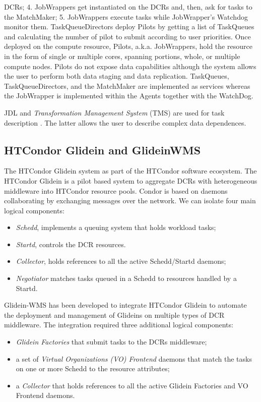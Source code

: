 DCRs; 4. JobWrappers get instantiated on the DCRs and, then,  ask for tasks to the MatchMaker; 5. JobWrappers execute tasks while JobWrapper’s Watchdog monitor them.
TaskQueueDirectors deploy Pilots by getting a list of TaskQueues and calculating the number of pilot to submit  according to user priorities.
Once deployed on the compute resource, Pilots, a.k.a. JobWrappers, hold the resource in the form of single or multiple cores, spanning portions, whole, or multiple compute nodes. Pilots do not expose data capabilities although the system allows the user to perform both data staging and data replication. 
TaskQueues, TaskQueueDirectors, and the MatchMaker are implemented as services whereas the JobWrapper is implemented within the Agents together with the WatchDog. 

JDL and \emph{Transformation Management System} (TMS) are used for task description \cite{Tsaregorodtsev2006,Pacini2006}. The latter allows the user to describe complex data dependences. 
\subsection{HTCondor Glidein and GlideinWMS}
The HTCondor Glidein system  as part of the HTCondor software ecosystem. The HTCondor Glidein is a pilot based system to aggregate DCRs with heterogeneous middleware into HTCondor resource pools.
Condor is based on daemons collaborating by exchanging messages over the network. We can isolate four main logical components:
\begin{itemize}
\item \emph{Schedd}, implements a queuing system that holds workload tasks;
\item \emph{Startd}, controls the DCR resources. 
\item \emph{Collector}, holds references to all the active
Schedd/Startd daemons; 
\item \emph{Negotiator} matches tasks queued in a Schedd to resources handled by a Startd.
\end{itemize}
Glidein-WMS has been developed to integrate HTCondor Glidein to  automate the deployment and management of Glideins on multiple types of DCR middleware. 
The integration required three additional logical components: 
\begin{itemize}
\item \emph{Glidein Factories} that submit tasks to the DCRs middleware;
\item a set of \emph{Virtual Organizations (VO) Frontend} daemons that match the tasks on one or more Schedd to the resource attributes;
\item a \emph{Collector} that holds references to all the active Glidein Factories and VO Frontend daemons. 
\end{itemize}

